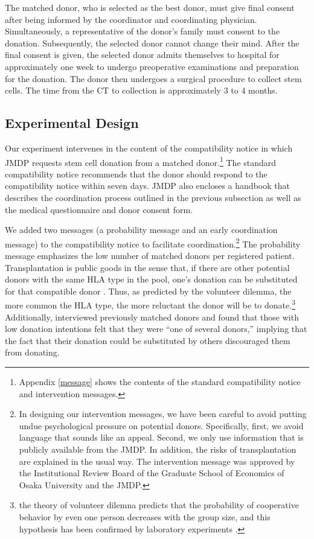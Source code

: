 \documentclass[12pt, a4paper]{article}
\begin{document}
The matched donor, who is selected as the best donor, must give final consent after being informed by the coordinator and coordinating physician. Simultaneously, a representative of the donor's family must consent to the donation. Subsequently, the selected donor cannot change their mind. After the final consent is given, the selected donor admits themselves to hospital for approximately one week to undergo preoperative examinations and preparation for the donation. The donor then undergoes a surgical procedure to collect stem cells. The time from the CT to collection is approximately 3 to 4 months.

\hypertarget{design}{%
\subsection{Experimental Design}\label{design}}

Our experiment intervenes in the content of the compatibility notice in which JMDP requests stem cell donation from a matched donor.\footnote{Appendix \ref{message} shows the contents of the standard compatibility notice and intervention messages.} The standard compatibility notice recommends that the donor should respond to the compatibility notice within seven days. JMDP also encloses a handbook that describes the coordination process outlined in the previous subsection as well as the medical questionnaire and donor consent form.

We added two messages (a probability message and an early coordination message) to the compatibility notice to facilitate coordination.\footnote{In designing our intervention messages, we have been careful to avoid putting undue psychological pressure on potential donors. Specifically, first, we avoid language that sounds like an appeal. Second, we only use information that is publicly available from the JMDP. In addition, the risks of transplantation are explained in the usual way. The intervention message was approved by the Institutional Review Board of the Graduate School of Economics of Osaka University and the JMDP.} The probability message emphasizes the low number of matched donors per registered patient. Transplantation is public goods in the sense that, if there are other potential donors with the same HLA type in the pool, one's donation can be substituted for that compatible donor \citep{Bergstrom2009}. Thus, as predicted by the volunteer dilemma, the more common the HLA type, the more reluctant the donor will be to donate.\footnote{the theory of volunteer dilemna predicts that the probability of cooperative behavior by even one person decreases with the group size, and this hypothesis has been confirmed by laboratory experiments \citep{Diekmann1985, Diekmann1986, Franzen1999, Davis2017}.} Additionally, \citet{Kurosawa2022} interviewed previously matched donors and found that those with low donation intentions felt that they were ``one of several donors,'' implying that the fact that their donation could be substituted by others discouraged them from donating.
\end{document}
